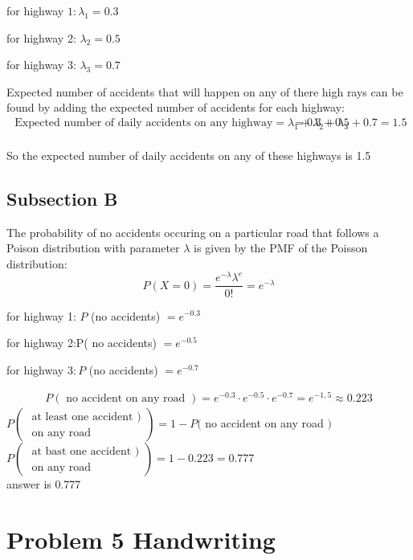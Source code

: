 \documentclass[a4paper,11pt]{article}
\theoremstyle{mytheor}
\begin{document}
for highway $1: \lambda_1=0.3$

for highway 2: $\lambda_2=0.5$

for highway 3: $\lambda_3=0.7$

Expected number of accidents that will happen on any of there high rays can be found by adding the expected number of accidents for each highway:
$$
\begin{aligned}
\text { Expected number of daily accidents on any highway} =\lambda_1+\lambda_2+\lambda_3 & =0.3+0.5+0.7= 1.5\\

\end{aligned}
$$

So the expected number of daily accidents on any of these highways is 1.5

\subsection{Subsection B}
The probability of no accidents occuring on a particular road that follows a Poison distribution with parameter $\lambda$ is given by the PMF of the Poisson distribution:
$$
P(X=0)=\frac{e^{-\lambda} \lambda^e}{0 !}=e^{-\lambda}
$$

for highway 1: $P$ (no accidents) $=e^{-0.3}$

for highway 2:P( no accidents) $=e^{-0.5}$

for highway $3: P$ (no accidents) $=e^{-0.7}$

$$
\begin{aligned}
P(\text { no accident on any road }) =e^{-0.3} \cdot e^{-0.5} \cdot e^{-0.7}= e^{-1,5} \approx 0.223
\end{aligned}
$$
\newpage
$P\left(\begin{array}{l}\text { at least one accident }) \\ \text { on any road }\end{array}\right)=1-P($ no accident on any road $)$\\

$P\left(\begin{array}{l}\text { at bast one accident }) \\ \text { on any road }\end{array}\right)=1-0.223=0.777$\\

answer is 0.777

\section{Problem 5 Handwriting}
\end{document}
